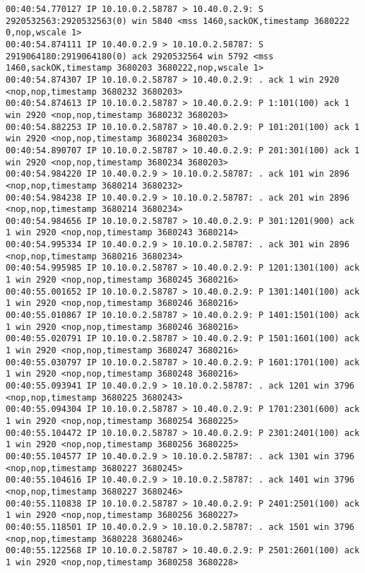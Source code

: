 \documentclass[a4paper,12pt]{article}
\begin{document}
\begin{Verbatim}
00:40:54.770127 IP 10.10.0.2.58787 > 10.40.0.2.9: S 2920532563:2920532563(0) win 5840 <mss 1460,sackOK,timestamp 3680222 0,nop,wscale 1>
00:40:54.874111 IP 10.40.0.2.9 > 10.10.0.2.58787: S 2919064180:2919064180(0) ack 2920532564 win 5792 <mss 1460,sackOK,timestamp 3680203 3680222,nop,wscale 1>
00:40:54.874307 IP 10.10.0.2.58787 > 10.40.0.2.9: . ack 1 win 2920 <nop,nop,timestamp 3680232 3680203>
00:40:54.874613 IP 10.10.0.2.58787 > 10.40.0.2.9: P 1:101(100) ack 1 win 2920 <nop,nop,timestamp 3680232 3680203>
00:40:54.882253 IP 10.10.0.2.58787 > 10.40.0.2.9: P 101:201(100) ack 1 win 2920 <nop,nop,timestamp 3680234 3680203>
00:40:54.890707 IP 10.10.0.2.58787 > 10.40.0.2.9: P 201:301(100) ack 1 win 2920 <nop,nop,timestamp 3680234 3680203>
00:40:54.984220 IP 10.40.0.2.9 > 10.10.0.2.58787: . ack 101 win 2896 <nop,nop,timestamp 3680214 3680232>
00:40:54.984238 IP 10.40.0.2.9 > 10.10.0.2.58787: . ack 201 win 2896 <nop,nop,timestamp 3680214 3680234>
00:40:54.984656 IP 10.10.0.2.58787 > 10.40.0.2.9: P 301:1201(900) ack 1 win 2920 <nop,nop,timestamp 3680243 3680214>
00:40:54.995334 IP 10.40.0.2.9 > 10.10.0.2.58787: . ack 301 win 2896 <nop,nop,timestamp 3680216 3680234>
00:40:54.995985 IP 10.10.0.2.58787 > 10.40.0.2.9: P 1201:1301(100) ack 1 win 2920 <nop,nop,timestamp 3680245 3680216>
00:40:55.001652 IP 10.10.0.2.58787 > 10.40.0.2.9: P 1301:1401(100) ack 1 win 2920 <nop,nop,timestamp 3680246 3680216>
00:40:55.010867 IP 10.10.0.2.58787 > 10.40.0.2.9: P 1401:1501(100) ack 1 win 2920 <nop,nop,timestamp 3680246 3680216>
00:40:55.020791 IP 10.10.0.2.58787 > 10.40.0.2.9: P 1501:1601(100) ack 1 win 2920 <nop,nop,timestamp 3680247 3680216>
00:40:55.030797 IP 10.10.0.2.58787 > 10.40.0.2.9: P 1601:1701(100) ack 1 win 2920 <nop,nop,timestamp 3680248 3680216>
00:40:55.093941 IP 10.40.0.2.9 > 10.10.0.2.58787: . ack 1201 win 3796 <nop,nop,timestamp 3680225 3680243>
00:40:55.094304 IP 10.10.0.2.58787 > 10.40.0.2.9: P 1701:2301(600) ack 1 win 2920 <nop,nop,timestamp 3680254 3680225>
00:40:55.104472 IP 10.10.0.2.58787 > 10.40.0.2.9: P 2301:2401(100) ack 1 win 2920 <nop,nop,timestamp 3680256 3680225>
00:40:55.104577 IP 10.40.0.2.9 > 10.10.0.2.58787: . ack 1301 win 3796 <nop,nop,timestamp 3680227 3680245>
00:40:55.104616 IP 10.40.0.2.9 > 10.10.0.2.58787: . ack 1401 win 3796 <nop,nop,timestamp 3680227 3680246>
00:40:55.110838 IP 10.10.0.2.58787 > 10.40.0.2.9: P 2401:2501(100) ack 1 win 2920 <nop,nop,timestamp 3680256 3680227>
00:40:55.118501 IP 10.40.0.2.9 > 10.10.0.2.58787: . ack 1501 win 3796 <nop,nop,timestamp 3680228 3680246>
00:40:55.122568 IP 10.10.0.2.58787 > 10.40.0.2.9: P 2501:2601(100) ack 1 win 2920 <nop,nop,timestamp 3680258 3680228>

\end{Verbatim}
\end{document}
